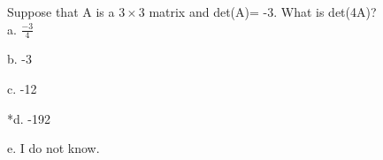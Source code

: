
Suppose that A is a \(3\times3 \) matrix and det(A)= -3. What is det(4A)?\\

a. \(\frac{- 3}{4}\)

b. -3

c. -12

*d. -192

e. I do not know.\\
